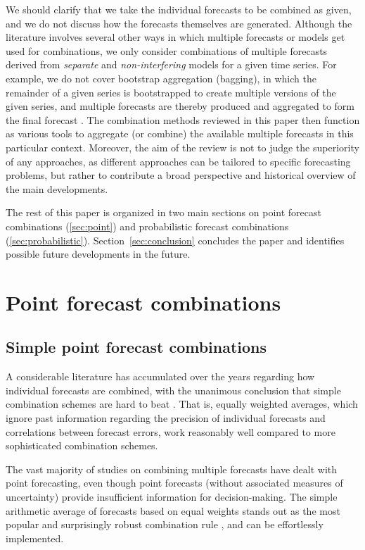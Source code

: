 \documentclass[11pt]{article}
\begin{document}
We should clarify that we take the individual forecasts to be combined as given, and we do not discuss how the forecasts themselves are generated. Although the literature involves several other ways in which multiple forecasts or models get used for combinations, we only consider combinations of multiple forecasts derived from \textit{separate} and \textit{non-interfering} models for a given time series. For example, we do not cover bootstrap aggregation (bagging), in which the remainder of a given series is bootstrapped to create multiple versions of the given series, and multiple forecasts are thereby produced and aggregated to form the final forecast \citep[see, for example,][]{Bergmeir2016-ae,Petropoulos2018-fw}. The combination methods reviewed in this paper then function as various tools to aggregate (or combine) the available multiple forecasts in this particular context. Moreover, the aim of the review is not to judge the superiority of any approaches, as different approaches can be tailored to specific forecasting problems, but rather to contribute a broad perspective and historical overview of the main developments.

The rest of this paper is organized in two main sections on point forecast combinations (\autoref{sec:point}) and probabilistic forecast combinations (\autoref{sec:probabilistic}). Section~\ref{sec:conclusion} concludes the paper and identifies possible future developments in the future.

\section{Point forecast combinations}
\label{sec:point}

\subsection{Simple point forecast combinations}
\label{sec:simple_comb}

A considerable literature has accumulated over the years regarding how individual forecasts are combined, with the unanimous conclusion that simple combination schemes are hard to beat \citep{Kang1986-kq,Clemen1989-fb,Fischer1999-kz,Stock2004-rq,Lichtendahl2020-ut}. That is, equally weighted averages, which ignore past information regarding the precision of individual forecasts and correlations between forecast errors, work reasonably well compared to more sophisticated combination schemes.

The vast majority of studies on combining multiple forecasts have dealt with point forecasting, even though point forecasts (without associated measures of uncertainty) provide insufficient information for decision-making. The simple arithmetic average of forecasts based on equal weights stands out as the most popular and surprisingly robust combination rule \citep[see][]{Bunn1985-vo,Clemen1986-pd,Stock2003-sp,Genre2013-ut}, and can be effortlessly implemented.
\end{document}

